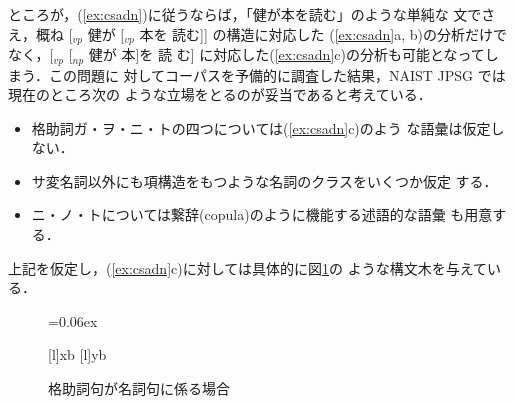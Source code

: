 ところが，(\ref{ex:csadn})に従うならば，「健が本を読む」のような単純な
文でさえ，概ね [$_{vp}$ 健が [$_{vp}$ 本を 読む]] の構造に対応した
(\ref{ex:csadn}a, b)の分析だけでなく，[$_{vp}$ [$_{np}$ 健が 本]を 読
む] に対応した(\ref{ex:csadn}c)の分析も可能となってしまう．この問題に
対してコーパスを予備的に調査した結果，NAIST JPSG では現在のところ次の
ような立場をとるのが妥当であると考えている．
\begin{itemize}
\item[1.] 格助詞ガ・ヲ・ニ・トの四つについては(\ref{ex:csadn}c)のよう
な語彙は仮定しない．
\item[2.] サ変名詞以外にも項構造をもつような名詞のクラスをいくつか仮定
する．
\item[3.] ニ・ノ・トについては繋辞(copula)のように機能する述語的な語彙
も用意する．
\end{itemize}
上記を仮定し，(\ref{ex:csadn}c)に対しては具体的に図\ref{fig:copula}の
ような構文木を与えている．
\begin{figure}
\begin{center}
\unitlength=0.06ex
\end{center}
[l]{xb}
[l]{yb}
\caption{格助詞句が名詞句に係る場合}\label{fig:copula}
\end{figure}

